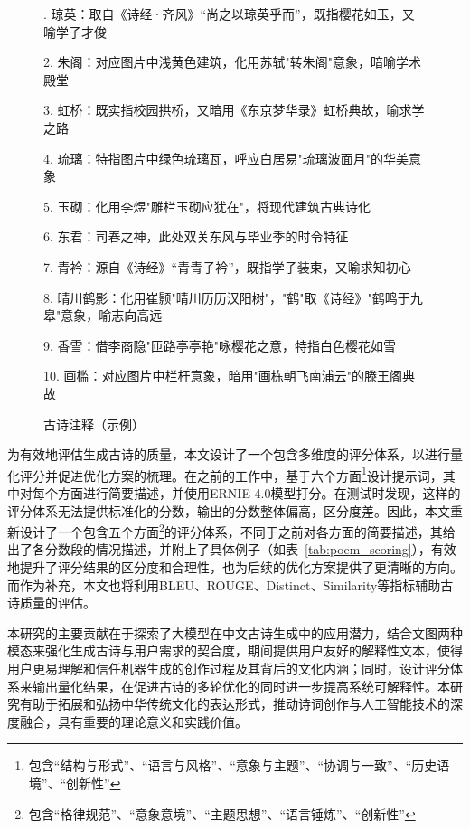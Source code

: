 \begin{figure}[ht]
  \begin{tcolorbox}[
      colback=white, %
      colframe=black, 
      boxrule=1pt,        %
      arc=0mm,             %
  ]. 琼英：取自《诗经·齐风》“尚之以琼英乎而”，既指樱花如玉，又喻学子才俊\par
      2. 朱阁：对应图片中浅黄色建筑，化用苏轼"转朱阁"意象，暗喻学术殿堂\par
      3. 虹桥：既实指校园拱桥，又暗用《东京梦华录》虹桥典故，喻求学之路\par
      4. 琉璃：特指图片中绿色琉璃瓦，呼应白居易"琉璃波面月"的华美意象\par
      5. 玉砌：化用李煜"雕栏玉砌应犹在"，将现代建筑古典诗化\par
      6. 东君：司春之神，此处双关东风与毕业季的时令特征\par
      7. 青衿：源自《诗经》“青青子衿”，既指学子装束，又喻求知初心\par
      8. 晴川鹤影：化用崔颢"晴川历历汉阳树"，"鹤"取《诗经》"鹤鸣于九皋"意象，喻志向高远\par
      9. 香雪：借李商隐"匝路亭亭艳"咏樱花之意，特指白色樱花如雪\par
      10. 画槛：对应图片中栏杆意象，暗用"画栋朝飞南浦云"的滕王阁典故\par
  \end{tcolorbox}
  \caption{古诗注释（示例）}
  \label{fig:example_annotation} %
\end{figure}





为有效地评估生成古诗的质量，本文设计了一个包含多维度的评分体系，以进行量化评分并促进优化方案的梳理。在之前的工作中，基于六个方面\footnote{包含“结构与形式”、“语言与风格”、“意象与主题”、“协调与一致”、“历史语境”、“创新性”}设计提示词，其中对每个方面进行简要描述，并使用ERNIE-4.0模型打分。在测试时发现，这样的评分体系无法提供标准化的分数，输出的分数整体偏高，区分度差。因此，本文重新设计了一个包含五个方面\footnote{包含“格律规范”、“意象意境”、“主题思想”、“语言锤炼”、“创新性”}的评分体系，不同于之前对各方面的简要描述，其给出了各分数段的情况描述，并附上了具体例子（如表~\ref{tab:poem_scoring}），有效地提升了评分结果的区分度和合理性，也为后续的优化方案提供了更清晰的方向。而作为补充，本文也将利用BLEU、ROUGE、Distinct、Similarity等指标辅助古诗质量的评估。



本研究的主要贡献在于探索了大模型在中文古诗生成中的应用潜力，结合文图两种模态来强化生成古诗与用户需求的契合度，期间提供用户友好的解释性文本，使得用户更易理解和信任机器生成的创作过程及其背后的文化内涵；同时，设计评分体系来输出量化结果，在促进古诗的多轮优化的同时进一步提高系统可解释性。本研究有助于拓展和弘扬中华传统文化的表达形式，推动诗词创作与人工智能技术的深度融合，具有重要的理论意义和实践价值。

